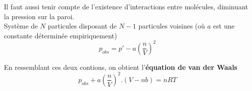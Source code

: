 \documentclass	[11pt, a4paper, openany]{book}
\begin{document}
	Il faut aussi tenir compte de l'existence d'interactions entre molécules, diminuant la pression sur la paroi.\\
	Système de $N$ particules disposant de $N-1$ particules voisines (où $a$ est une constante déterminée empiriquement)
	$$p_{obs} = p' - a\left(\frac{n}{V}\right)^2$$
	
	En ressemblant ces deux contions, on obtient l'\textbf{équation de van der Waals}
	$$p_{obs} + a\left(\frac{n}{V}\right)^2 .\left(V -nb\right) = nRT$$
	
	
	
	
	\appendix
	
	
\end{document}
